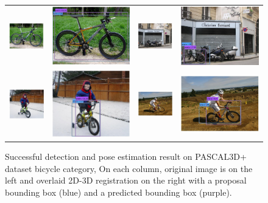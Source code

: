\documentclass[10pt,twocolumn,letterpaper]{article}
\begin{document}
\begin{figure}[h]
\begin{tabular}{|cc|cc|}
  \includegraphics[width=0.22\linewidth]{supp/pas_bicycle1a.png} &
  \includegraphics[width=0.22\linewidth]{supp/pas_bicycle1b.png} & 
  \includegraphics[width=0.22\linewidth]{supp/pas_bicycle2a.png} &
  \includegraphics[width=0.22\linewidth]{supp/pas_bicycle2b.png}  \\
  \includegraphics[width=0.22\linewidth]{supp/pas_bicycle11a.png} &
  \includegraphics[width=0.22\linewidth]{supp/pas_bicycle11b.png} & 
  \includegraphics[width=0.22\linewidth]{supp/pas_bicycle12a.png} &
  \includegraphics[width=0.22\linewidth]{supp/pas_bicycle12b.png}  \\
  \hline
  \end{tabular}
\caption{Successful detection and pose estimation result on PASCAL3D+ dataset
  bicycle category, On each column, original image is on the left and overlaid
  2D-3D registration on the right with a proposal bounding box (blue) and a
  predicted bounding box (purple).} 
  \label{fig:pascal3d_bicycle_good}
\end{figure}
\end{document}
